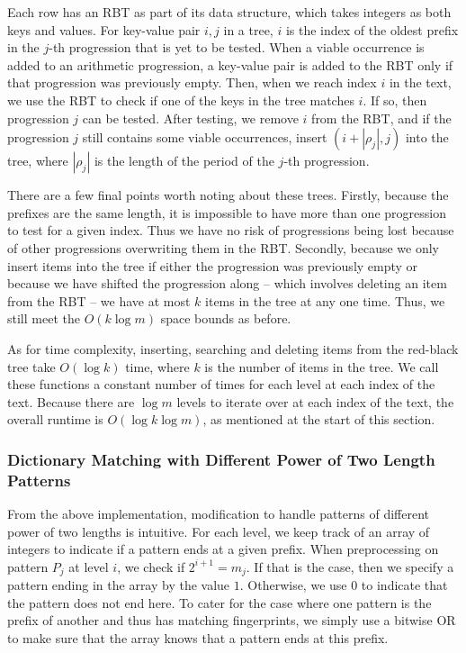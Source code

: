 \documentclass[ %
                    author={Dominic Joseph Moylett},
                    degree={MEng},
                     title={Dictionary Matching with Fingerprints},
                  subtitle={An Empirical Analysis},
                      type={research},
                      year={2015} ]{dissertation}
\begin{document}
Each row has an RBT as part of its data structure, which takes integers as both keys and values. For key-value pair $i, j$ in a tree, $i$ is the index of the oldest prefix in the $j$-th progression that is yet to be tested. When a viable occurrence is added to an arithmetic progression, a key-value pair is added to the RBT only if that progression was previously empty. Then, when we reach index $i$ in the text, we use the RBT to check if one of the keys in the tree matches $i$. If so, then progression $j$ can be tested. After testing, we remove $i$ from the RBT, and if the progression $j$ still contains some viable occurrences, insert $(i + |\rho_j|, j)$ into the tree, where $|\rho_j|$ is the length of the period of the $j$-th progression.

There are a few final points worth noting about these trees. Firstly, because the prefixes are the same length, it is impossible to have more than one progression to test for a given index. Thus we have no risk of progressions being lost because of other progressions overwriting them in the RBT. Secondly, because we only insert items into the tree if either the progression was previously empty or because we have shifted the progression along -- which involves deleting an item from the RBT -- we have at most $k$ items in the tree at any one time. Thus, we still meet the $O(k\log m)$ space bounds as before.

As for time complexity, inserting, searching and deleting items from the red-black tree take $O(\log k)$ time, where $k$ is the number of items in the tree. We call these functions a constant number of times for each level at each index of the text. Because there are $\log m$ levels to iterate over at each index of the text, the overall runtime is $O(\log k\log m)$, as mentioned at the start of this section.

\subsubsection{Dictionary Matching with Different Power of Two Length Patterns}

From the above implementation, modification to handle patterns of different power of two lengths is intuitive. For each level, we keep track of an array of integers to indicate if a pattern ends at a given prefix. When preprocessing on pattern $P_j$ at level $i$, we check if $2^{i + 1} = m_j$. If that is the case, then we specify a pattern ending in the array by the value $1$. Otherwise, we use $0$ to indicate that the pattern does not end here. To cater for the case where one pattern is the prefix of another and thus has matching fingerprints, we simply use a bitwise OR to make sure that the array knows that a pattern ends at this prefix.
\end{document}
